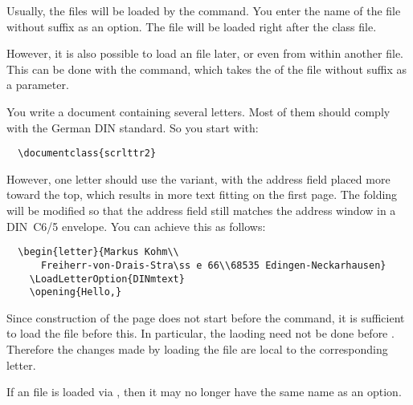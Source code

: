 \begin{Declaration}
\end{Declaration}
%
Usually, the  files will be loaded by the
 command. You enter the name of the  file
without suffix as an option. The  file will be loaded right
after the class file.

However, it is also possible to load an  file later, or even
from within another  file. This can be done with the
 command, which takes the  of the
 file without suffix as a parameter.
\begin{Example}
You write a document containing several letters. Most of them should
comply with the German DIN standard. So you start with:
\begin{lstlisting}
  \documentclass{scrlttr2}
\end{lstlisting}
However, one letter should use the  variant, with the
address field placed more toward the top, which results in more text
fitting on the first page. The folding will be modified so that the
address field still matches the address window in a DIN~C6/5 envelope.
You can achieve this as follows:
\begin{lstlisting}
  \begin{letter}{Markus Kohm\\
      Freiherr-von-Drais-Stra\ss e 66\\68535 Edingen-Neckarhausen}
    \LoadLetterOption{DINmtext}
    \opening{Hello,}
\end{lstlisting}
Since construction of the page does not start before the
 command, it is sufficient to load the  file
before this. In particular, the laoding need not be done before
. Therefore the changes made by
loading the  file are local to the corresponding letter.
\end{Example}

\begin{Explain}
  If an  file is loaded
  via , then it may no longer have the same name
  as an option.
\end{Explain}

